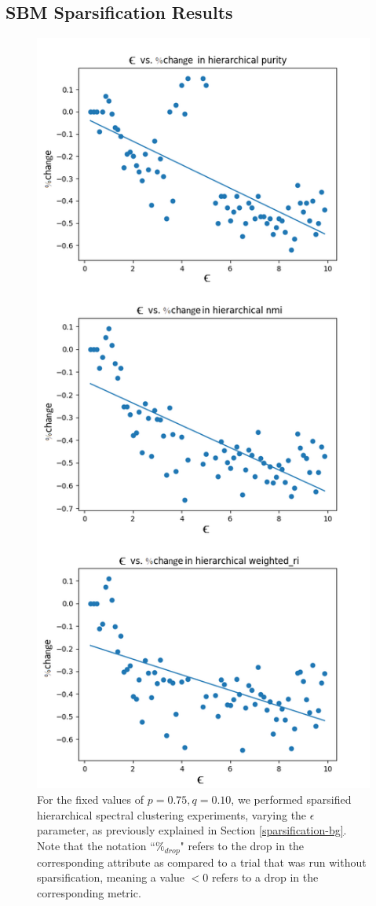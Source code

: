 \documentclass{article}
\begin{document}
\subsection{SBM Sparsification Results}

\begin{figure}[H]
    \centering
    \includegraphics[width=.55\textwidth]{results/results_hierarchical_sparsify.png}
    \caption[Sparsified hierarchical spectral clustering for $p=0.75,q=0.10$]{For the fixed values of $p=0.75,q=0.10$, we performed sparsified hierarchical spectral clustering experiments, varying the $\epsilon$ parameter, as previously explained in Section \ref{sparsification-bg}. Note that the notation ``$\%_{drop}$" refers to the drop in the corresponding attribute as compared to a trial that was run without sparsification, meaning a value $<0$ refers to a drop in the corresponding metric.}
    \label{fig:results_hierarchical_sparsify}
\end{figure}
\end{document}
